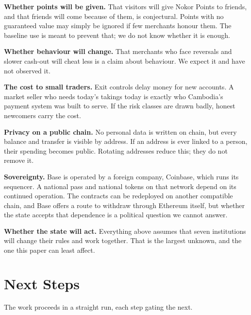 \documentclass[10pt,letterpaper,twocolumn]{article}
\newcommand{\runin}[1]{\textbf{#1}\quad}
\begin{document}
\runin{Whether points will be given.} That visitors will give Nokor Points to
friends, and that friends will come because of them, is conjectural. Points
with no guaranteed value may simply be ignored if few merchants honour them.
The baseline use is meant to prevent that; we do not know whether it is enough.

\runin{Whether behaviour will change.} That merchants who face reversals and
slower cash-out will cheat less is a claim about behaviour. We expect it and
have not observed it.

\runin{The cost to small traders.} Exit controls delay money for new accounts.
A market seller who needs today's takings today is exactly who Cambodia's
payment system was built to serve. If the risk classes are drawn badly, honest
newcomers carry the cost.

\runin{Privacy on a public chain.} No personal data is written on chain, but
every balance and transfer is visible by address. If an address is ever linked
to a person, their spending becomes public. Rotating addresses reduce this;
they do not remove it.

\runin{Sovereignty.} Base is operated by a foreign company, Coinbase, which
runs its sequencer. A national pass and national tokens on that network depend
on its continued operation. The contracts can be redeployed on another
compatible chain, and Base offers a route to withdraw through Ethereum itself,
but whether the state accepts that dependence is a political question we
cannot answer.

\runin{Whether the state will act.} Everything above assumes that seven
institutions will change their rules and work together. That is the largest
unknown, and the one this paper can least affect.

\section{Next Steps}
\label{sec:next}

The work proceeds in a straight run, each step gating the next.
\end{document}
